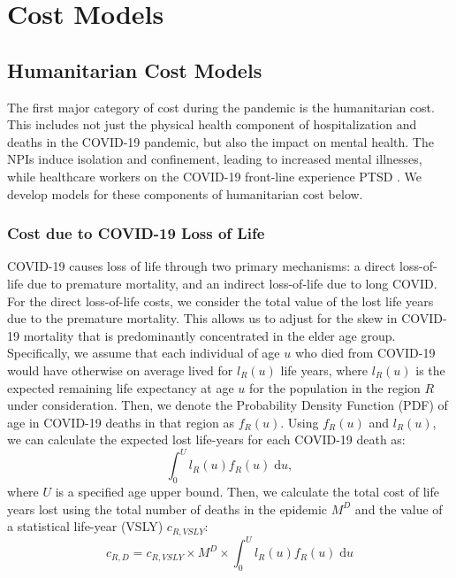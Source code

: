 \documentclass[msom,blindrev]{informs3} %
\renewcommand{\d}{\mathrm{d}}
\begin{document}
\section{Cost Models}

\subsection{Humanitarian Cost Models}
\label{subsec:humanitarian_cost}
The first major category of cost during the pandemic is the humanitarian cost. This includes not just the physical health component of hospitalization and deaths in the COVID-19 pandemic, but also the impact on mental health. The NPIs induce isolation and confinement, leading to increased mental illnesses, while healthcare workers on the COVID-19 front-line experience PTSD . We develop models for these components of humanitarian cost below. 


\subsubsection*{Cost due to COVID-19 Loss of Life}

COVID-19 causes loss of life through two primary mechanisms: a direct loss-of-life due to premature mortality, and an indirect loss-of-life due to long COVID. For the direct loss-of-life costs, we consider the total value of the lost life years due to the premature mortality. This allows us to adjust for the skew in COVID-19 mortality that is predominantly concentrated in the elder age group. Specifically, we assume that each individual of age $u$ who died from COVID-19 would have otherwise on average lived for $l_R(u)$ life years, where $l_R(u)$ is the expected remaining life expectancy at age $u$ for the population in the region $R$ under consideration. Then, we denote the Probability Density Function (PDF) of age in COVID-19 deaths in that region as $f_R(u)$. Using $f_R(u)$ and $l_R(u)$, we can calculate the expected lost life-years for each COVID-19 death as:
\begin{equation}
    \int_0^{U} l_R(u)f_R(u) \; \d u,
\end{equation}
where $U$ is a specified age upper bound. Then, we calculate the total cost of life years lost using the total number of deaths in the epidemic $M^D$ and the value of a statistical life-year (VSLY) $c_{R,VSLY}$:
\begin{equation}
    c_{R,D}= c_{R,VSLY} \times M^D \times  \int_0^{U} l_R(u)f_R(u) \; \d u
\end{equation}
\end{document}
